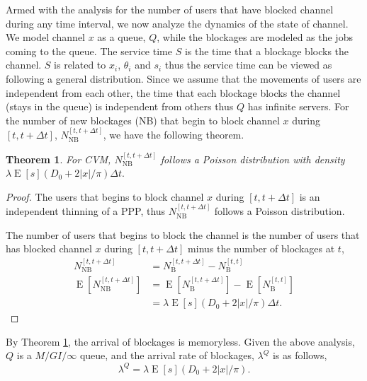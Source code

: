 \documentclass[10pt, conference, letterpaper]{IEEEtran}
\newtheorem{theorem}{Theorem}
\DeclareMathOperator*{\E}{\mathrm{E}}
\begin{document}
Armed with the analysis for the number of users that have blocked channel during any time interval, we now analyze the dynamics of the state of channel. We model channel $x$ as a queue, $Q$, while the blockages are modeled as the jobs coming to the queue. 
The service time $S$ is the time that a blockage blocks the channel. $S$ is related to $x_i$, $\theta_i$ and $s_i$ thus the service time can be viewed as following a general distribution. Since we assume that the movements of users are independent from each other, the time that each blockage blocks the channel (stays in the queue) is independent from others thus $Q$ has infinite servers. For the number of new blockages (NB) that begin to block channel $x$ during $[t, t+\Delta t]$, $N_{\mathrm{NB}}^{[t, t+\Delta t]}$, we have the following theorem.

\begin{theorem}\label{theorem:poisson_arrival}
For CVM, $N_{\mathrm{NB}}^{[t, t+\Delta t]}$ follows a Poisson distribution with density $\lambda\E[s](D_0 + 2|x|/\pi)\Delta t.$
\end{theorem}
\begin{proof}
The users that begins to block channel $x$ during $[t, t+\Delta t]$ is an independent thinning of a PPP, thus $N_{\mathrm{NB}}^{[t, t+\Delta t]}$ follows a Poisson distribution. 

The number of users that begins to block the channel is the number of users that has blocked channel $x$ during $[t, t+\Delta t]$ minus the number of blockages at $t$,  
\begin{equation*}
\begin{aligned}
N_{\mathrm{NB}}^{[t, t+\Delta t]} & = N_\mathrm{B}^{[t, t+\Delta t]} - N_\mathrm{B}^{[t, t]} \\
\E[N_{\mathrm{NB}}^{[t, t+\Delta t]}] & = \E[N_\mathrm{B}^{[t, t+\Delta t]}] - \E[N_\mathrm{B}^{[t, t]}] \\
									  & = \lambda\E[s](D_0 + 2|x|/\pi)\Delta t.
\end{aligned}
\end{equation*}
\end{proof}

By Theorem \ref{theorem:poisson_arrival}, the arrival of blockages is memoryless.  Given the above analysis, $Q$ is a $M/GI/\infty$ queue,  and the arrival rate of blockages, $\lambda^Q$ is as follows,
\begin{equation}\label{eq:lambda_queue}
\lambda^Q = \lambda\E[s](D_0 + 2|x|/\pi).
\end{equation} 
\end{document}
